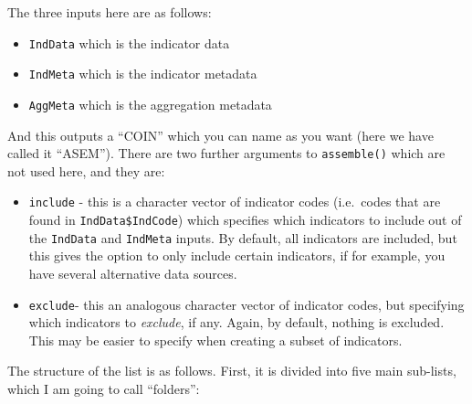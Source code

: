 \documentclass[
]{book}
\providecommand{\tightlist}{%
  \setlength{\itemsep}{0pt}\setlength{\parskip}{0pt}}
\begin{document}
The three inputs here are as follows:

\begin{itemize}
\tightlist
\item
  \texttt{IndData} which is the indicator data
\item
  \texttt{IndMeta} which is the indicator metadata
\item
  \texttt{AggMeta} which is the aggregation metadata
\end{itemize}

And this outputs a ``COIN'' which you can name as you want (here we have called it ``ASEM''). There are two further arguments to \texttt{assemble()} which are not used here, and they are:

\begin{itemize}
\tightlist
\item
  \texttt{include} - this is a character vector of indicator codes (i.e.~codes that are found in \texttt{IndData\$IndCode}) which specifies which indicators to include out of the \texttt{IndData} and \texttt{IndMeta} inputs. By default, all indicators are included, but this gives the option to only include certain indicators, if for example, you have several alternative data sources.
\item
  \texttt{exclude}- this an analogous character vector of indicator codes, but specifying which indicators to \emph{exclude}, if any. Again, by default, nothing is excluded. This may be easier to specify when creating a subset of indicators.
\end{itemize}

The structure of the list is as follows. First, it is divided into five main sub-lists, which I am going to call ``folders'':
\end{document}
